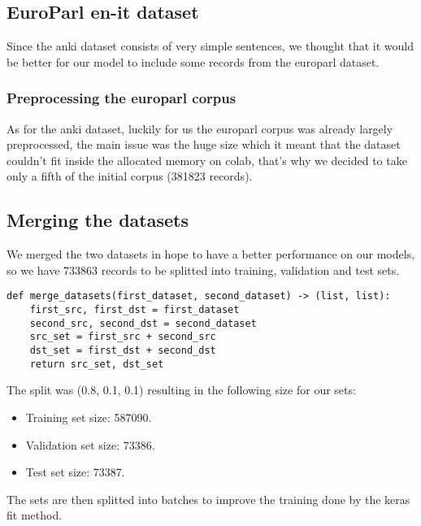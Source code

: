 \subsection{EuroParl en-it dataset}
Since the anki dataset consists of very simple sentences, we thought that it would be better for our model to include some records from the europarl dataset.
\subsubsection{Preprocessing the europarl corpus}
As for the anki dataset, luckily for us the europarl corpus was already largely preprocessed, the main issue was the huge size which it meant that the dataset couldn't fit inside the allocated memory on colab, that's why we decided to take only a fifth of the initial corpus (381823 records).
\begin{comment}
\begin{verbatim}
def create_dataset_euparl(name: str, src: str = "en", dst: str = "it",
                        size: float = 1) -> (list, list):
    with open(name+".{0}".format(src), encoding="UTF-8") as datafile:
        src_set = datafile.readlines()

    with open(name+".{0}".format(dst), encoding="UTF-8") as datafile:
        dst_set = datafile.readlines()

    if size != 1:
        if size > 1 or size < 0:
            raise ValueError("No correct size for the euparl corpus")
        
        datasets_to_shuffle = list((zip(src_set, dst_set)))
        np.random.shuffle(datasets_to_shuffle)
        src_set, dst_set = zip(*datasets_to_shuffle)
        src_set = list(src_set[:int(len(src_set) * size)])
        dst_set = list(dst_set[:int(len(dst_set) * size)])
        
    return src_set, dst_set
\end{verbatim}
\end{comment}
\subsection{Merging the datasets}
We merged the two datasets in hope to have a better performance on our models, so we have 733863 records to be splitted into training, validation and test sets.
\begin{verbatim}
def merge_datasets(first_dataset, second_dataset) -> (list, list):
    first_src, first_dst = first_dataset
    second_src, second_dst = second_dataset
    src_set = first_src + second_src
    dst_set = first_dst + second_dst
    return src_set, dst_set
\end{verbatim}
The split was (0.8, 0.1, 0.1) resulting in the following size for our sets:
\begin{itemize}
    \item Training set size: 587090.
    \item Validation set size: 73386.
    \item Test set size: 73387.
\end{itemize}
The sets are then splitted into batches to improve the training done by the keras fit method.
